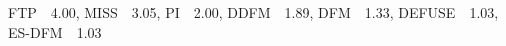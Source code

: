 \textsc{FTP}~\cite{li2021follow}~4.00, \textsc{MISS}~\cite{liu2024online}~3.05, \textsc{PI}~\cite{zhang2025personalized}~2.00, \textsc{DDFM}~\cite{dai2023dually}~1.89, \textsc{DFM}~\cite{chapelle2014modeling}~1.33, \textsc{DEFUSE}~\cite{chen2022asymptotically}~1.03, \textsc{ES{-}DFM}~\cite{yang2021capturing}~1.03%
